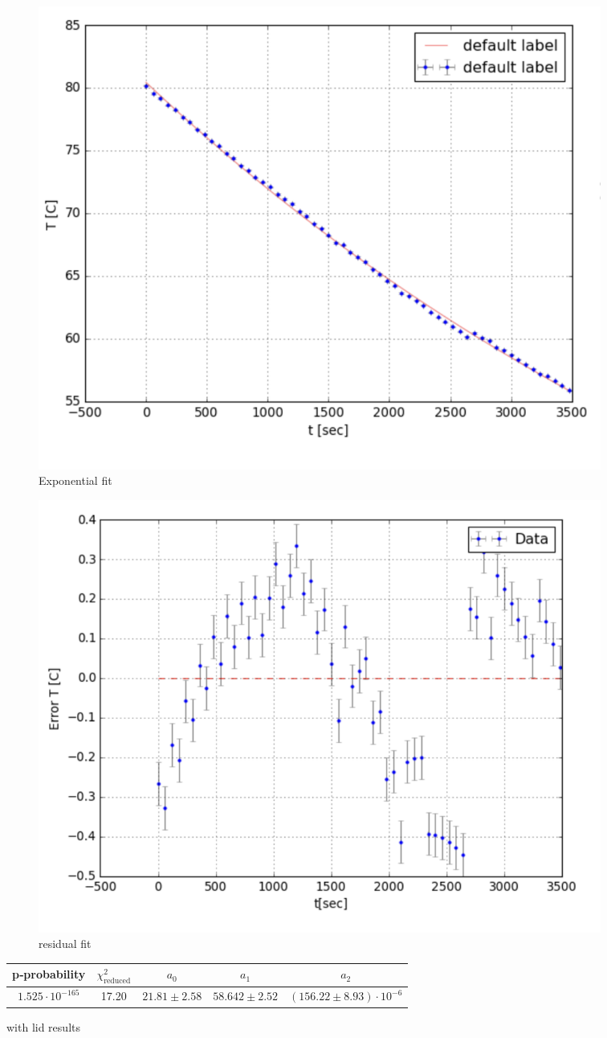 \documentclass[12pt,a4paper]{report}
\begin{document}
\begin{figure}[htbp]
    \centering
    \begin{subfigure}[b]{0.48\textwidth}
      \includegraphics[width=\textwidth]{with lid/cooling fit.png}
      \caption{Exponential fit}
      \label{fig:with lid fit}
    \end{subfigure}
    \hfill
    \begin{subfigure}[b]{0.48\textwidth}
      \includegraphics[width=\textwidth]{with lid/residuals fit.png}
      \caption{residual fit}
      \label{fig:with lid residual}
    \end{subfigure}
    \caption{with lid results}
\vspace{1em}
\begin{tabular}{ccccc}
\toprule
p‑probability & $\chi^2_{\mathrm{reduced}}$ & $a_0$ & $a_1$ & $a_2$ \\
\midrule
 $1.525 \cdot 10^{-165}$ & 17.20& $21.81 \pm 2.58$ & $58.642 \pm 2.52$ & $(156.22 \pm 8.93) \cdot 10^{-6}$ \\
\bottomrule
\end{tabular}
    \label{fig:risults with lid}
\end{figure}
\end{document}
